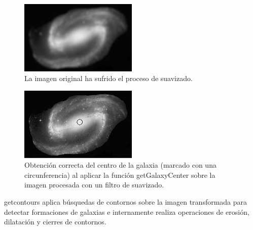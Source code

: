 	\begin{figure}[!htb]
		\centering
		\includegraphics[width=0.5\textwidth]{images/galaxiCenterFromImage_02_Blur.png}
		\caption{\label{fig:galaxiCenterFromImage_02_Blur}La imagen original ha sufrido el proceso de suavizado.}
	\end{figure}
	\begin{figure}[!htb]
		\centering
		\includegraphics[width=0.5\textwidth]{images/galaxiCenterFromImage_03_Correct.png}
		\caption{\label{fig:galaxiCenterFromImage_03_Correct}{\small Obtención correcta del centro de la galaxia (marcado con una circunferencia) al aplicar la función {\scriptsize getGalaxyCenter} sobre la imagen procesada con un filtro de suavizado.}}
	\end{figure}
	{\scriptsize getcontours} aplica búsquedas de contornos sobre la imagen transformada para detectar formaciones de galaxias e internamente realiza operaciones de erosión, dilatación y cierres de contornos.
